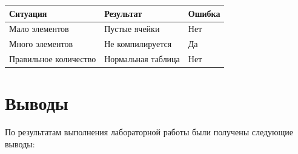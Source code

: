 \documentclass[12pt,a4paper]{article}
\begin{document}
\begin{center}
\begin{tabular}{|l|l|l|}
\hline
\textbf{Ситуация} & \textbf{Результат} & \textbf{Ошибка} \\
\hline
Мало элементов & Пустые ячейки & Нет \\
\hline
Много элементов & Не компилируется & Да \\
\hline
Правильное количество & Нормальная таблица & Нет \\
\hline
\end{tabular}
\end{center}

\section{Выводы}

По результатам выполнения лабораторной работы были получены следующие выводы:
\end{document}
